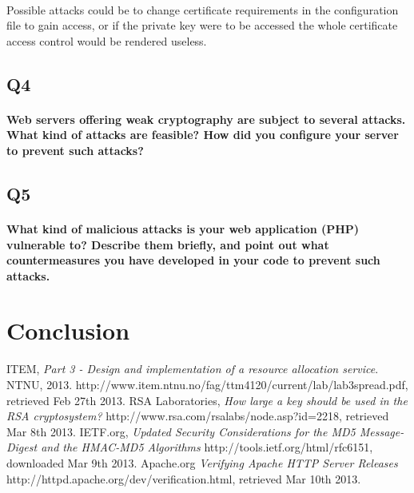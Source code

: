 \documentclass[a4paper,11pt]{article}
\begin{document}
\paragraph{}Possible attacks could be to change certificate requirements in the configuration file to gain access, or if the private key were to be accessed the whole certificate access control would be rendered useless.
\subsection{Q4}
\paragraph{Web servers offering weak cryptography are subject to several attacks. What kind of attacks are feasible? How did you conﬁgure your server to prevent such attacks?}
\subsection{Q5}
\paragraph{What kind of malicious attacks is your web application (PHP) vulnerable to? Describe
them brieﬂy, and point out what countermeasures you have developed in your code to prevent
such attacks.}
\section*{Conclusion}
\begin{thebibliography}{9}
ITEM, 
	\emph{Part 3 - Design and implementation of a resource allocation service}.
	NTNU, 2013.  http://www.item.ntnu.no/fag/ttm4120/current/lab/lab3spread.pdf, retrieved Feb 27th 2013.
RSA Laboratories, \emph{How large a key should be used in the RSA cryptosystem?} http://www.rsa.com/rsalabs/node.asp?id=2218, retrieved Mar 8th 2013.	
IETF.org, \emph{Updated Security Considerations for the MD5 Message-Digest and the HMAC-MD5 Algorithms} http://tools.ietf.org/html/rfc6151, downloaded Mar 9th 2013.
 Apache.org \emph{Verifying Apache HTTP Server Releases} http://httpd.apache.org/dev/verification.html, retrieved Mar 10th 2013.
\end{thebibliography}
\listoffigures
\end{document}
